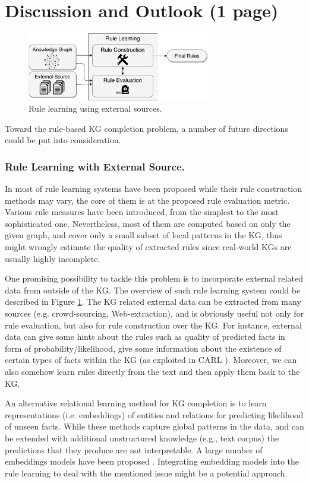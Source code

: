 \section{Discussion and Outlook (1 page)}
\label{sec:discussion_outlook}
\begin{figure}[t]
\centering
\includegraphics[width=8cm]{figures/discussion_overview}
\caption{Rule learning using external sources.}
\label{fig:discussion_overview}
\end{figure}
Toward the rule-based KG completion problem, a number of future directions could be put into consideration.
\subsubsection{Rule Learning with External Source.}
In most of rule learning systems have been proposed \cite{amie,op,rdf2rules} while their rule construction methods may vary, the core of them is at the proposed rule evaluation metric. Various rule measures have been introduced, from the simplest to the most sophisticated one. Nevertheless, most of them are computed based on only the given graph, and cover only a small subset of local patterns in the KG, thus might wrongly estimate the quality of extracted rules since real-world KGs are usually highly incomplete.

One promising possibility to tackle this problem is to incorporate external related data from outside of the KG. The overview of such rule learning system could be described in Figure \ref{fig:discussion_overview}. The KG related external data can be extracted from many sources (e.g. crowd-sourcing, Web-extraction), and is obviously useful not only for rule evaluation, but also for rule construction over the KG. For instance, external data can give some hints about the rules such as quality of predicted facts in form of probability/likelihood, give some information about the existence of certain types of facts within the KG (as exploited in CARL \cite{carl}). Moreover, we can also somehow learn rules directly from the text and then apply them back to the KG.

An alternative relational learning method for KG completion is to learn representations (i.e. embeddings) of entities and relations for predicting likelihood of unseen facts. While these methods capture global patterns in the data, and can be extended with additional unstructured knowledge (e.g., text corpus) the predictions that they produce are not interpretable. A large number of embeddings models have been proposed \cite{8047276}. Integrating embedding models into the rule learning to deal with the mentioned issue might be a potential approach.
